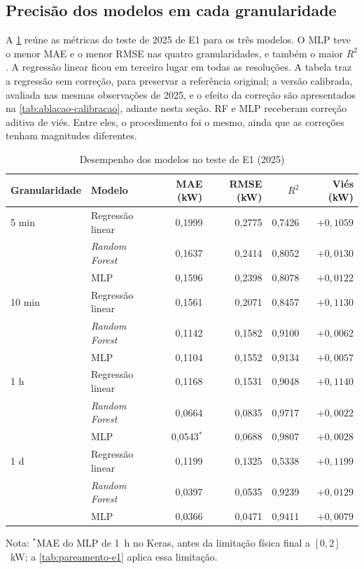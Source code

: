 \subsection{Precisão dos modelos em cada granularidade}
\label{sec:resultados-comparacao-modelos}

A \cref{tab:resultados-comparacao-offline} reúne as métricas do teste de
2025 de E1 para os três modelos. O MLP teve o menor MAE e o menor RMSE nas
quatro granularidades, e também o maior $R^2$. A regressão linear ficou em
terceiro lugar em todas as resoluções. A tabela traz a regressão sem
correção, para preservar a referência original; a versão calibrada, avaliada
nas mesmas observações de 2025, e o efeito da correção são apresentados na
\cref{tab:ablacao-calibracao}, adiante nesta seção. RF e MLP receberam
correção aditiva de viés. Entre eles, o procedimento foi o mesmo,
ainda que as correções tenham magnitudes diferentes.

\begin{table}[htbp]
    \centering
    \small
    \caption{Desempenho dos modelos no teste de E1 (2025)}
    \label{tab:resultados-comparacao-offline}
    \begin{tabular}{llrrrr}
        \toprule
        Granularidade & Modelo & MAE (kW) & RMSE (kW) & $R^2$ & Viés (kW) \\
        \midrule
        5 min  & Regressão linear & 0,1999 & 0,2775 & 0,7426 & $+0,1059$ \\
               & \textit{Random Forest}   & 0,1637 & 0,2414 & 0,8052 & $+0,0130$ \\
               & MLP             & 0,1596 & 0,2398 & 0,8078 & $+0,0122$ \\
        \midrule
        10 min & Regressão linear & 0,1561 & 0,2071 & 0,8457 & $+0,1130$ \\
               & \textit{Random Forest}   & 0,1142 & 0,1582 & 0,9100 & $+0,0062$ \\
               & MLP             & 0,1104 & 0,1552 & 0,9134 & $+0,0057$ \\
        \midrule
        1 h    & Regressão linear & 0,1168 & 0,1531 & 0,9048 & $+0,1140$ \\
               & \textit{Random Forest}   & 0,0664 & 0,0835 & 0,9717 & $+0,0022$ \\
               & MLP             & 0,0543$^{*}$ & 0,0688 & 0,9807 & $+0,0028$ \\
        \midrule
        1 d    & Regressão linear & 0,1199 & 0,1325 & 0,5338 & $+0,1199$ \\
               & \textit{Random Forest}   & 0,0397 & 0,0535 & 0,9239 & $+0,0129$ \\
               & MLP             & 0,0366 & 0,0471 & 0,9411 & $+0,0079$ \\
        \bottomrule
    \end{tabular}
    \par{\footnotesize Nota: $^{*}$MAE do MLP de 1~h no Keras, antes da
    limitação física final a $[0{,}2]$~kW; a \cref{tab:pareamento-e1} aplica
    essa limitação.}
\end{table}

